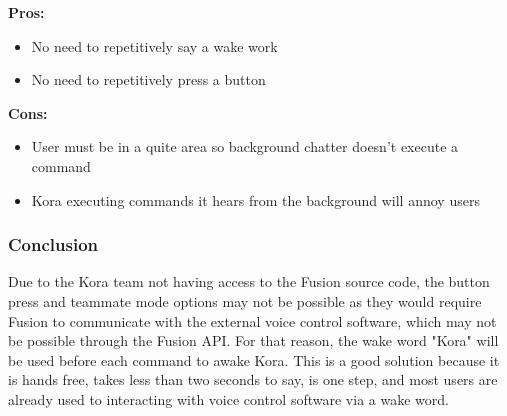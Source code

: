 \documentclass[onecolumn, draftclsnofoot,10pt, compsoc]{IEEEtran}
\begin{document}
	\textbf{Pros:}
	\begin{itemize}
		\item{
			No need to repetitively say a wake work}
		\item{
			No need to repetitively press a button}
	\end{itemize}

	\textbf{Cons:}
	\begin{itemize}
		\item{
			User must be in a quite area so background chatter doesn't execute a command}
		\item{
			Kora executing commands it hears from the background will annoy users}
	\end{itemize}


	\subsubsection{Conclusion}
	Due to the Kora team not having access to the Fusion source code, the button press and teammate mode options may not be possible as they would require Fusion to communicate with the external voice control software, which may not be possible through the Fusion API.
	For that reason, the wake word "Kora" will be used before each command to awake Kora.
	This is a good solution because it is hands free, takes less than two seconds to say, is one step, and most users are already used to interacting with voice control software via a wake word.















\clearpage
\end{document}

